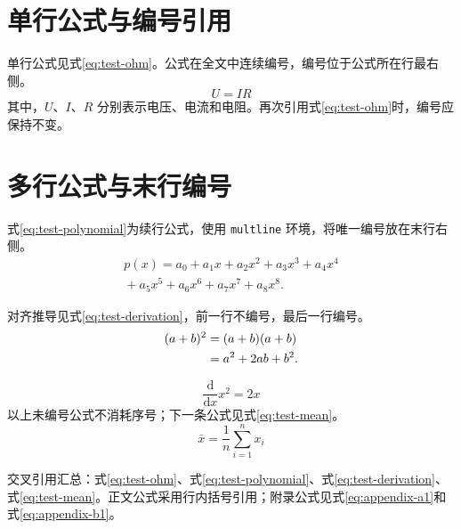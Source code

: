 \section{单行公式与编号引用}

单行公式见式\eqref{eq:test-ohm}。公式在全文中连续编号，编号位于公式所在行最右侧。
\begin{equation}
  U = I R
  \label{eq:test-ohm}
\end{equation}
其中，$U$、$I$、$R$ 分别表示电压、电流和电阻。再次引用式\eqref{eq:test-ohm}时，编号应保持不变。

\section{多行公式与末行编号}

式\eqref{eq:test-polynomial}为续行公式，使用 \texttt{multline} 环境，将唯一编号放在末行右侧。
\begin{multline}
  p(x)=a_0+a_1x+a_2x^2+a_3x^3+a_4x^4 \\
       {}+a_5x^5+a_6x^6+a_7x^7+a_8x^8.
  \label{eq:test-polynomial}
\end{multline}

对齐推导见式\eqref{eq:test-derivation}，前一行不编号，最后一行编号。
\begin{align}
  (a+b)^2 &= (a+b)(a+b) \notag\\
          &= a^2+2ab+b^2.
  \label{eq:test-derivation}
\end{align}

\begin{equation*}
  \frac{\mathrm{d}}{\mathrm{d}x}x^2 = 2x
\end{equation*}
以上未编号公式不消耗序号；下一条公式见式\eqref{eq:test-mean}。
\begin{equation}
  \bar{x}=\frac{1}{n}\sum_{i=1}^{n}x_i
  \label{eq:test-mean}
\end{equation}

交叉引用汇总：式\eqref{eq:test-ohm}、式\eqref{eq:test-polynomial}、式\eqref{eq:test-derivation}、式\eqref{eq:test-mean}。正文公式采用行内括号引用；附录公式见式\eqref{eq:appendix-a1}和式\eqref{eq:appendix-b1}。
